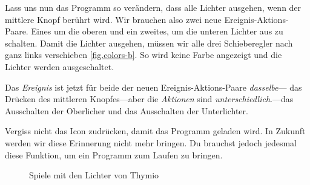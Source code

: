 

Lass uns nun das Programm so verändern, dass alle Lichter ausgehen, wenn der
mittlere Knopf berührt wird. Wir brauchen also zwei neue
Ereignis-Aktions-Paare. Eines um die oberen und ein zweites,
um die unteren Lichter aus zu schalten. Damit die Lichter ausgehen, müssen wir alle drei
Schieberegler nach ganz links verschieben \cref{fig.colors-b}. So wird keine Farbe angezeigt und die Lichter werden ausgeschaltet.

Das \emph{Ereignis} ist jetzt für beide der neuen Ereignis-Aktions-Paare \emph{dasselbe}--- das Drücken des mittleren Knopfes---aber die \emph{Aktionen} sind \emph{unterschiedlich}.---das Ausschalten der Oberlicher und das Ausschalten der Unterlichter.

Vergiss nicht das Icon  zudrücken, damit das Programm geladen wird. In Zukunft werden wir diese Erinnerung nicht mehr bringen. Du brauchst jedoch jedesmal diese Funktion, um ein Programm zum Laufen zu bringen. 

\vfill


\begin{figure}
    \centering
	\hspace{1.5cm}
    \caption{Spiele mit den Lichter von Thymio}
    \label{fig.colors}
\end{figure}